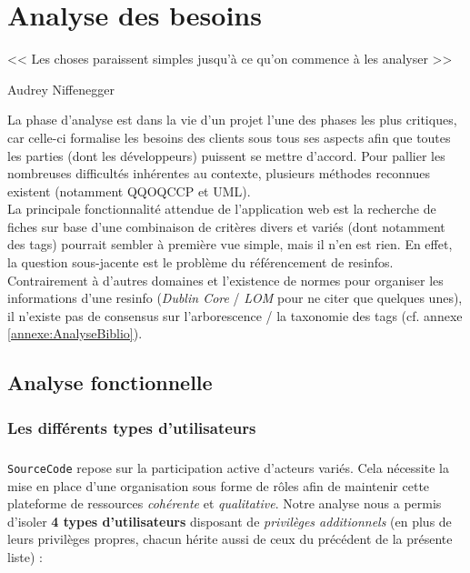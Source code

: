 \chapter{Analyse des besoins}
\label{chapter:analyseDesBesoins}

\epigraph{<< Les choses paraissent simples jusqu'à ce qu'on commence à les analyser >>}{Audrey Niffenegger}

La phase d'analyse est dans la vie d'un projet l'une des phases les plus critiques, car celle-ci formalise les besoins des clients sous tous ses aspects afin que toutes les parties (dont les développeurs) puissent se mettre d'accord. Pour pallier les nombreuses difficultés inhérentes au contexte, plusieurs méthodes reconnues existent (notamment \Gls{QQOQCCP} et UML). \\

La principale fonctionnalité attendue de l'application web est la recherche de \glspl{fiche} sur base d'une combinaison de critères divers et variés (dont notamment des \glspl{tag}) pourrait sembler à première vue simple, mais il n'en est rien. En effet, la question sous-jacente est le problème du référencement de \glspl{resinfo}. Contrairement à d'autres domaines et l'existence de normes pour organiser les informations d'une \gls{resinfo} (\textit{Dublin Core} / \textit{LOM} pour ne citer que quelques unes), il n'existe pas de consensus sur l'arborescence / la taxonomie des \glspl{tag} (cf. annexe \ref{annexe:AnalyseBiblio}).

\section{Analyse fonctionnelle}
\label{section:analyseFonctionnelle}

\subsection*{Les différents types d'utilisateurs}



\paragraph{} \texttt{SourceCode} repose sur la participation active d'acteurs variés. Cela nécessite la mise en place d'une organisation sous forme de rôles afin de maintenir cette plateforme de ressources \textit{cohérente} et \textit{qualitative}. Notre analyse nous a permis d'isoler \textbf{4 types d'utilisateurs} disposant de \textit{privilèges additionnels} (en plus de leurs privilèges propres, chacun hérite aussi de ceux du précédent de la présente liste) :


